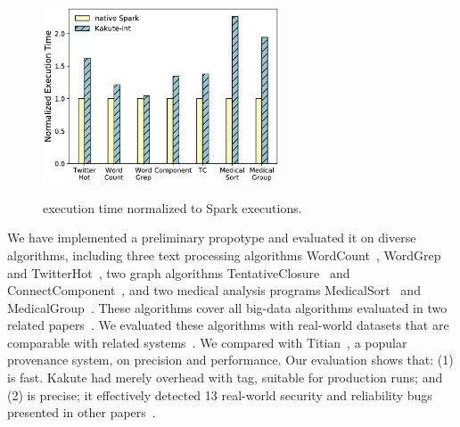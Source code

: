 \begin{figure}
  \vspace{-.1in}
  \includegraphics[width=7cm]{figures/time_overhead.ps}\\
  \vspace{-.3in}
  \caption{\kakute execution time normalized to Spark executions.}
  \label{fig:scalability}
\end{figure}

 We have implemented a \kakute preliminary propotype 
and evaluated it on \appeval diverse algorithms, including three text 
processing algorithms WordCount~\cite{spark:example}, 
WordGrep~\cite{newt:socc13} and TwitterHot~\cite{spark:example}, two graph 
algorithms TentativeClosure~\cite{spark:example}
and ConnectComponent~\cite{spark:example}, and two medical analysis programs 
MedicalSort~\cite{pigmix} and MedicalGroup~\cite{pigmix}.
These algorithms cover all big-data algorithms evaluated in two related 
papers~\cite{vldb15:titian,icse16:bigdebug}. We evaluated these algorithms with 
real-world datasets that are comparable with related 
systems~\cite{vldb16:output, icse16:bigdebug, vldb15:titian}.
We compared \kakute with Titian~\cite{vldb15:titian}, a popular provenance 
system, on precision and performance. Our evaluation shows that: (1) \kakute is 
fast. Kakute had merely \timeavg overhead with  tag, suitable for 
production runs; and (2) \kakute is precise; it effectively detected 13 
real-world security and reliability bugs presented in 
other papers~\cite{arthur:dave2013,icse16:bigdebug,airavat:nsdi10}.












